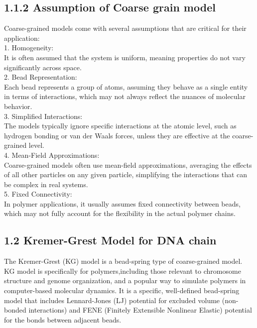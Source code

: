\documentclass[12pt]{article}
\begin{document}
\begin{flushleft}
\subsection*{1.1.2 Assumption of Coarse grain model}
Coarse-grained models come with several assumptions that are critical for their application:\\
    1. Homogeneity:\\
    It is often assumed that the system is uniform, meaning properties do not vary significantly across space. \\
    2. Bead Representation:\\
        Each bead represents a group of atoms, assuming they behave as a single entity in terms of interactions, which may not always reflect the nuances of molecular behavior. \\
    3. Simplified Interactions:\\
        The models typically ignore specific interactions at the atomic level, such as hydrogen bonding or van der Waals forces, unless they are effective at the coarse-grained level. \\
    4. Mean-Field Approximations:\\
        Coarse-grained models often use mean-field approximations, averaging the effects of all other particles on any given particle, simplifying the interactions that can be complex in real systems. \\
    5. Fixed Connectivity:\\
        In polymer applications, it usually assumes fixed connectivity between beads, which may not fully account for the flexibility in the actual polymer chains. \\ 


\subsection*{1.2 Kremer-Grest Model for DNA chain}


	
The Kremer-Grest (KG) model is a bead-spring type of coarse-grained model. KG model is specifically for polymers,including those relevant to chromosome structure and genome organization, and a popular way to simulate polymers in computer-based molecular dynamics. It is a specific, well-defined bead-spring model that includes Lennard-Jones (LJ) potential for excluded volume (non-bonded interactions) and FENE (Finitely Extensible Nonlinear Elastic) potential for the bonds between adjacent beads.	



\end{flushleft}
\end{document}
